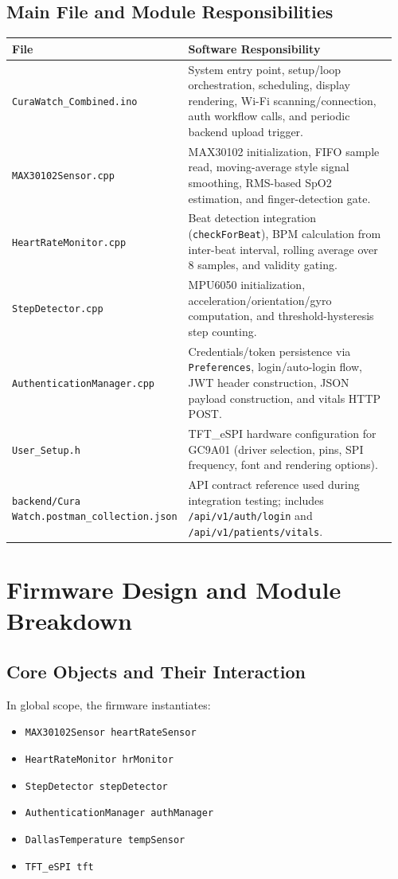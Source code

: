 \documentclass[12pt,a4paper]{report}
\begin{document}
\subsection{Main File and Module Responsibilities}
\begin{longtable}{p{0.29\linewidth} p{0.67\linewidth}}
\toprule
\textbf{File} & \textbf{Software Responsibility} \\
\midrule
\endhead
\texttt{CuraWatch\_Combined.ino} & System entry point, setup/loop orchestration, scheduling, display rendering, Wi-Fi scanning/connection, auth workflow calls, and periodic backend upload trigger. \\
\texttt{MAX30102Sensor.cpp} & MAX30102 initialization, FIFO sample read, moving-average style signal smoothing, RMS-based SpO2 estimation, and finger-detection gate. \\
\texttt{HeartRateMonitor.cpp} & Beat detection integration (\texttt{checkForBeat}), BPM calculation from inter-beat interval, rolling average over 8 samples, and validity gating. \\
\texttt{StepDetector.cpp} & MPU6050 initialization, acceleration/orientation/gyro computation, and threshold-hysteresis step counting. \\
\texttt{AuthenticationManager.cpp} & Credentials/token persistence via \texttt{Preferences}, login/auto-login flow, JWT header construction, JSON payload construction, and vitals HTTP POST. \\
\texttt{User\_Setup.h} & TFT\_eSPI hardware configuration for GC9A01 (driver selection, pins, SPI frequency, font and rendering options). \\
\texttt{backend/Cura Watch.postman\_collection.json} & API contract reference used during integration testing; includes \texttt{/api/v1/auth/login} and \texttt{/api/v1/patients/vitals}. \\
\bottomrule
\end{longtable}

\section{Firmware Design and Module Breakdown}
\subsection{Core Objects and Their Interaction}
In global scope, the firmware instantiates:
\begin{itemize}
  \item \texttt{MAX30102Sensor heartRateSensor}
  \item \texttt{HeartRateMonitor hrMonitor}
  \item \texttt{StepDetector stepDetector}
  \item \texttt{AuthenticationManager authManager}
  \item \texttt{DallasTemperature tempSensor}
  \item \texttt{TFT\_eSPI tft}
\end{itemize}
\end{document}
